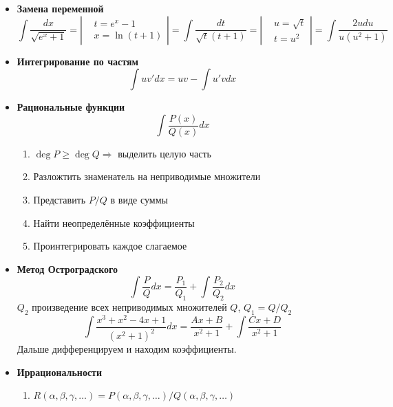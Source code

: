 \documentclass{article}
\begin{document}
\begin{itemize}
    \item \textbf{Замена переменной}
          \begin{equation*}
              \int\frac{dx}{\sqrt{e^x+1}} = \left|
              \begin{aligned}
                   & t = e^x-1    \\
                   & x = \ln(t+1)
              \end{aligned} \right| = \int\frac{dt}{\sqrt{t}(t+1)} = \left|
              \begin{aligned}
                   & u = \sqrt{t} \\
                   & t = u^2
              \end{aligned} \right| = \int\frac{2udu}{u(u^2+1)}
          \end{equation*}
    \item \textbf{Интегрирование по частям}
          \begin{equation*}
              \int u v'dx = uv - \int u' v dx
          \end{equation*}
    \item \textbf{Рациональные функции}
          $$\int\frac{P(x)}{Q(x)}dx $$
          \begin{enumerate}
              \item $\deg P \geq \deg Q \Rightarrow$ выделить целую часть
              \item Разложтить знаменатель на неприводимые множители
              \item Представить $P/Q$ в виде суммы
              \item Найти неопределённые коэффициенты
              \item Проинтегрировать каждое слагаемое
          \end{enumerate}
    \item \textbf{Метод Остроградского}
          $$ \int \frac{P}{Q}dx = \frac{P_1}{Q_1} + \int \frac{P_2}{Q_2}dx$$
          $Q_2$ произведение всех неприводимых множителей $Q$, $Q_1 = Q/Q_2$
          $$ \int\frac{x^3+x^2-4x+1}{(x^2+1)^2}dx = \frac{Ax + B}{x^2+1} + \int\frac{Cx + D}{x^2+1} $$
          Дальше дифференцируем и находим коэффициенты.
    \item \textbf{Иррациональности}
          \begin{enumerate}
              \item $R(\alpha,\beta, \gamma,\ldots) = {P(\alpha, \beta, \gamma, \ldots)}/{Q(\alpha, \beta, \gamma, \ldots)} $

\end{enumerate}
\end{itemize}
\end{document}
